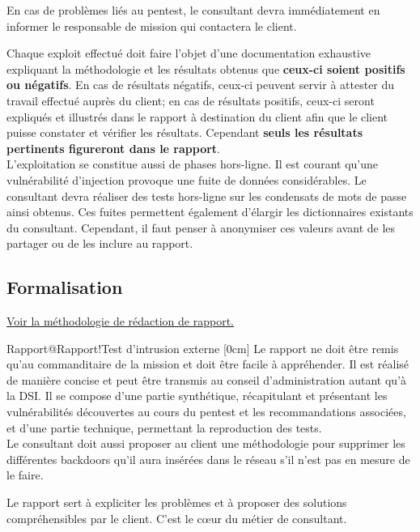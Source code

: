 \documentclass[twoside,a4paper,12pt,titlepage]{book}
\newcommand{\MarginPar}[2]{\marginnote{\scriptsize #1}[#2]}
\begin{document}
\begin{Stop}En cas de problèmes liés au pentest, le consultant devra immédiatement en informer le responsable de mission qui contactera le client.\end{Stop}
	Chaque exploit effectué doit faire l'objet d'une documentation exhaustive expliquant la méthodologie et les résultats obtenus que \textbf{ceux-ci soient positifs ou négatifs}. En cas de résultats négatifs, ceux-ci peuvent servir à attester du travail effectué auprès du client; en cas de résultats positifs, ceux-ci seront expliqués et illustrés dans le rapport à destination du client afin que le client puisse constater et vérifier les résultats. Cependant \textbf{seuls les résultats pertinents figureront dans le rapport}.\\
	L'exploitation se constitue aussi de phases hors-ligne. Il est courant qu'une vulnérabilité d'injection provoque une fuite de données considérables. Le consultant devra réaliser des tests hors-ligne sur les condensats de mots de passe ainsi obtenus. Ces fuites permettent également d'élargir les dictionnaires existants du consultant. Cependant, il faut penser à anonymiser ces valeurs avant de les partager ou de les inclure au rapport.\\

\subsection{Formalisation}
\ForwardToIndex  \hspace{1em}  \hyperref[Rapport]{Voir la méthodologie de rédaction de rapport.}
\begin{Define}{Rapport@Rapport!Test d'intrusion externe}
	\MarginPar{\textbf{Rapport}}{0cm}
	Le rapport ne doit être remis qu'au commanditaire de la mission et doit être facile à appréhender. Il est réalisé de manière concise et peut être transmis au conseil d'administration autant qu'à la DSI. Il se compose d'une partie synthétique, récapitulant et présentant les vulnérabilités découvertes au cours du pentest et les recommandations associées, et d'une partie technique, permettant la reproduction des tests.\\
Le consultant doit aussi proposer au client une méthodologie pour supprimer les différentes backdoors qu'il aura insérées dans le réseau s'il n'est pas en mesure de le faire.
\end{Define}
Le rapport sert à expliciter les problèmes et à proposer des solutions compréhensibles par le client. C'est le cœur du métier de consultant.
\end{document}
